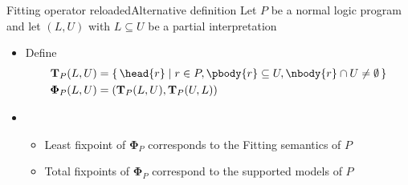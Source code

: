 \begin{frame}{Fitting operator reloaded}{Alternative definition}
  Let $P$ be a normal logic program\\
  and let $(L,U)$ with $L\subseteq U$ be a partial interpretation
  \medskip
  \begin{itemize}
  \item <2-> Define
    \begin{align*}
      {\mathbf{T}}_P(L,U)
      & =
      \{\, \head{r} \mid r \in P, \pbody{r} \subseteq U, \nbody{r} \cap U\neq \emptyset \,\}
      \\
      {\mathbf{\Phi}}_P(L,U)
      & =
      ({\mathbf{T}}_P(L,U),{\mathbf{T}}_P(U,L))
    \end{align*}
  \item <3-> 
    \begin{itemize}\normalsize
    \item Least fixpoint  of ${\mathbf{\Phi}}_P$ corresponds to the Fitting semantics of $P$
      \smallskip
    \item Total fixpoints of ${\mathbf{\Phi}}_P$ correspond  to the supported models of $P$
    \end{itemize}
  \end{itemize}
  \nocite{truszczynski18a}
\end{frame}
%
